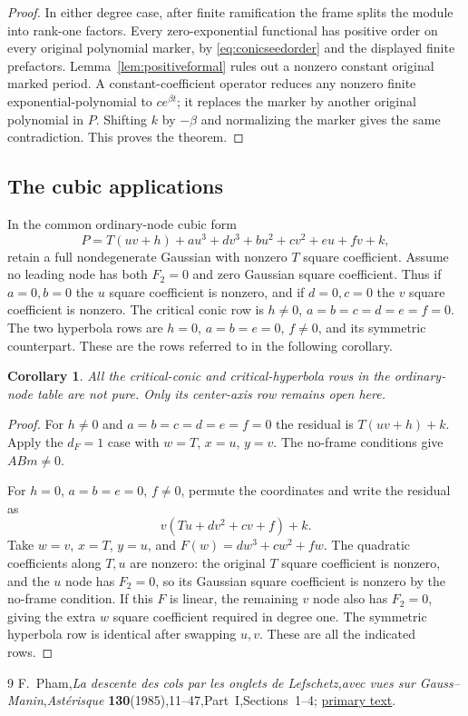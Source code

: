 \documentclass[11pt]{article}
\newtheorem{corollary}[theorem]{Corollary}
\theoremstyle{definition}\newtheorem{definition}[theorem]{Definition}
\theoremstyle{remark}\newtheorem{remark}[theorem]{Remark}
\begin{document}
\begin{proof}
In either degree case, after finite ramification the frame splits
the module into rank-one factors. Every zero-exponential
functional has positive order on every original polynomial
marker, by \eqref{eq:conicseedorder} and the displayed finite
prefactors. Lemma~\ref{lem:positiveformal} rules out a nonzero
constant original marked period. A constant-coefficient operator
reduces any nonzero finite exponential-polynomial to $c e^{\beta t}$;
it replaces the marker by another original polynomial in $P$.
Shifting $k$ by $-\beta$ and normalizing the marker gives the same
contradiction. This proves the theorem.
\end{proof}

\subsection{The cubic applications}
In the common ordinary-node cubic form
\[
 P=T(uv+h)+a u^3+d v^3+b u^2+c v^2+eu+fv+k,
\]
retain a full nondegenerate Gaussian with nonzero $T$ square coefficient.
Assume no leading node has both $F_2=0$ and zero Gaussian square
coefficient. Thus if $a=0,b=0$ the $u$ square coefficient is nonzero,
and if $d=0,c=0$ the $v$ square coefficient is nonzero. The critical
conic row is $h\ne0$, $a=b=c=d=e=f=0$. The two hyperbola rows
are $h=0$, $a=b=e=0$, $f\ne0$, and its symmetric counterpart.
These are the rows referred to in the following corollary.
\begin{corollary}\label{cor:ordinaryconics}
All the critical-conic and critical-hyperbola rows in the ordinary-node
table are not pure. Only its center-axis row remains open here.
\end{corollary}
\begin{proof}
For $h\ne0$ and $a=b=c=d=e=f=0$ the residual is
$T(uv+h)+k$. Apply the $d_F=1$ case with $w=T$, $x=u$, $y=v$.
The no-frame conditions give $ABm\ne0$.

For $h=0$, $a=b=e=0$, $f\ne0$, permute the coordinates and
write the residual as
\[
 v(Tu+d v^2+c v+f)+k.
\]
Take $w=v$, $x=T$, $y=u$, and
$F(w)=d w^3+c w^2+f w$. The quadratic coefficients along $T,u$
are nonzero: the original $T$ square coefficient is nonzero, and the $u$
node has $F_2=0$, so its Gaussian square coefficient is nonzero
by the no-frame condition. If this $F$ is linear, the remaining
$v$ node also has $F_2=0$, giving the extra $w$ square coefficient
required in degree one. The symmetric hyperbola row is identical
after swapping $u,v$. These are all the indicated rows.
\end{proof}
\begin{thebibliography}{9}
F.~Pham,\emph{La descente des cols par les onglets de
Lefschetz,avec vues sur Gauss--Manin},\emph{Ast\'erisque}
\textbf{130}(1985),11--47,Part~I,Sections~1--4;
\href{https://numdam.org/item/AST_1985__130__11_0/}{primary text}.
\end{thebibliography}
\end{document}
